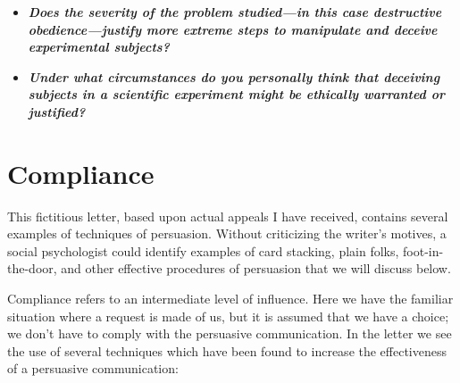 \documentclass[
]{book}
\providecommand{\tightlist}{%
  \setlength{\itemsep}{0pt}\setlength{\parskip}{0pt}}
\begin{document}
\begin{reflect}
\begin{itemize}
\tightlist
\item
  \textbf{\emph{Does the severity of the problem studied---in this case destructive obedience---justify more extreme steps to manipulate and deceive experimental subjects?}}\\
\item
  \textbf{\emph{Under what circumstances do you personally think that deceiving subjects in a scientific experiment might be ethically warranted or justified?}}
\end{itemize}
\end{reflect}

\hypertarget{compliance}{%
\section{Compliance}\label{compliance}}

This fictitious letter, based upon actual appeals I have received, contains several examples of techniques of persuasion. Without criticizing the writer's motives, a social psychologist could identify examples of card stacking, plain folks, foot-in-the-door, and other effective procedures of persuasion that we will discuss below.

Compliance refers to an intermediate level of influence. Here we have the familiar situation where a request is made of us, but it is assumed that we have a choice; we don't have to comply with the persuasive communication. In the letter we see the use of several techniques which have been found to increase the effectiveness of a persuasive communication:
\end{document}
